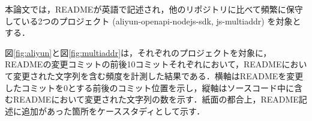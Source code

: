 \documentclass[uplatex,dvipdfmx,a4paper,twocolumn,base=11pt,jbase=11pt,ja=standard]{bxjsarticle}  %
\begin{document}

本論文では，READMEが英語で記述され，他のリポジトリに比べて頻繁に保守している2つのプロジェクト (aliyun-openapi-nodejs-sdk, js-multiaddr) を対象とする．


図\ref{fig:aliyun}と図\ref{fig:multiaddr}は，それぞれのプロジェクトを対象に，READMEの変更コミットの前後10コミットそれぞれにおいて，READMEにおいて変更された文字列を含む頻度を計測した結果である．横軸はREADMEを変更したコミットを0とする前後のコミット位置を示し，縦軸はソースコード中に含むREADMEにおいて変更された文字列の数を示す．紙面の都合上，README記述に追加があった箇所をケーススタディとして示す．




\end{document}
